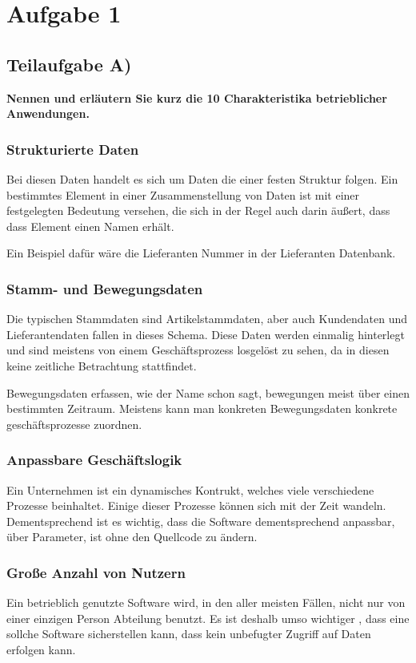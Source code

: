 \section{Aufgabe 1}

\subsection{Teilaufgabe A)}
\textbf{Nennen und erläutern Sie kurz die 10 Charakteristika betrieblicher
Anwendungen.}

\subsubsection{Strukturierte Daten}
Bei diesen Daten handelt es sich um Daten die einer festen Struktur folgen.
Ein bestimmtes Element in einer Zusammenstellung von Daten ist mit einer
festgelegten Bedeutung versehen, die sich in der Regel auch darin äußert, dass
dass Element einen Namen erhält.

Ein Beispiel dafür wäre die Lieferanten Nummer in der Lieferanten Datenbank.

\subsubsection{Stamm- und Bewegungsdaten}
Die typischen Stammdaten sind Artikelstammdaten, aber auch Kundendaten und
Lieferantendaten fallen in dieses Schema. Diese Daten werden einmalig
hinterlegt und sind meistens von einem Geschäftsprozess losgelöst zu sehen, da
in diesen keine zeitliche Betrachtung stattfindet.

Bewegungsdaten erfassen, wie der Name schon sagt, bewegungen meist über einen
bestimmten Zeitraum. Meistens kann man konkreten Bewegungsdaten konkrete
geschäftsprozesse zuordnen.

\subsubsection{Anpassbare Geschäftslogik}
Ein Unternehmen ist ein dynamisches Kontrukt, welches viele verschiedene
Prozesse beinhaltet. Einige dieser Prozesse können sich mit der Zeit wandeln.
Dementsprechend ist es wichtig, dass die Software dementsprechend anpassbar, \zB
über Parameter, ist ohne den Quellcode zu ändern.

\subsubsection{Große Anzahl von Nutzern}
Ein betrieblich genutzte Software wird, in den aller meisten Fällen, nicht nur
von einer einzigen Person \bzw Abteilung benutzt. Es ist deshalb umso wichtiger
, dass eine sollche Software sicherstellen kann, dass kein unbefugter Zugriff
auf Daten erfolgen kann.

